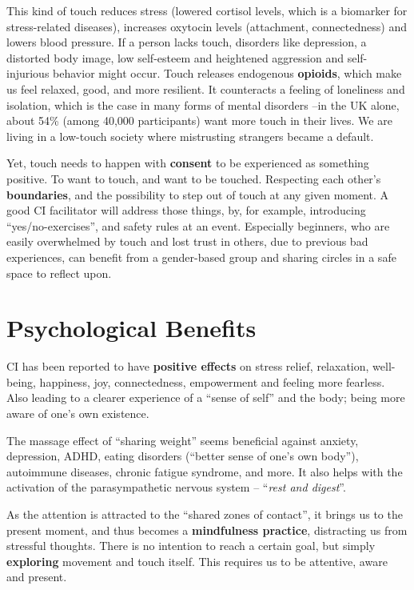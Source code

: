 This kind of touch reduces stress (lowered cortisol levels, which is a biomarker for stress-related diseases), increases oxytocin levels (attachment, connectedness) and lowers blood pressure.
If a person lacks touch, disorders like depression, a distorted body image, low self-esteem and heightened aggression and self-injurious behavior might occur.
Touch releases endogenous \textbf{opioids}, which make us feel relaxed, good, and more resilient.
It counteracts a feeling of loneliness and isolation, which is the case in many forms of mental disorders --in the UK alone, about 54\% (among 40,000 participants) want more touch in their lives.
We are living in a low-touch society where mistrusting strangers became a default.

Yet, touch needs to happen with \textbf{consent} to be experienced as something positive.
To want to touch, and want to be touched.
Respecting each other's \textbf{boundaries}, and the possibility to step out of touch at any given moment.
A good CI facilitator will address those things, by, for example, introducing ``yes/no-exercises'', and safety rules at an event.
Especially beginners, who are easily overwhelmed by touch and lost trust in others, due to previous bad experiences, can benefit from a gender-based group and sharing circles in a safe space to reflect upon.

\section{Psychological Benefits}\label{sec:psychological-health-benefits}

CI has been reported to have \textbf{positive effects} on stress relief, relaxation, well-being, happiness, joy, connectedness, empowerment and feeling more fearless.
Also leading to a clearer experience of a ``sense of self'' and the body; being more aware of one's own existence.

The massage effect of ``sharing weight'' seems beneficial against anxiety, depression, ADHD, eating disorders (``better sense of one's own body''), autoimmune diseases, chronic fatigue syndrome, and more.
It also helps with the activation of the parasympathetic nervous system -- ``\textit{rest and digest}''.

As the attention is attracted to the ``shared zones of contact'', it brings us to the present moment, and thus becomes a \textbf{mindfulness practice}, distracting us from stressful thoughts.
There is no intention to reach a certain goal, but simply \textbf{exploring} movement and touch itself.
This requires us to be attentive, aware and present.

